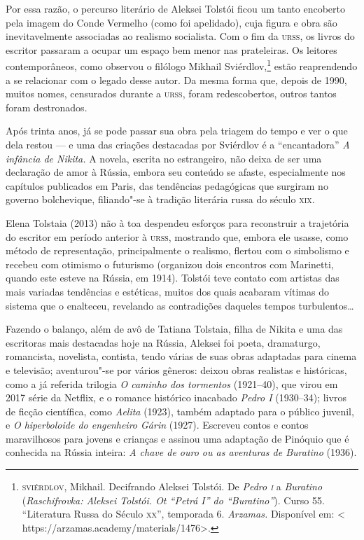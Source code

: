 Por essa razão, o percurso literário de Aleksei Tolstói ficou um tanto
encoberto pela imagem do Conde Vermelho (como foi apelidado), cuja
figura e obra são inevitavelmente associadas ao realismo socialista. Com
o fim da \textsc{urss}, os livros do escritor passaram a ocupar um espaço bem
menor nas prateleiras. Os leitores contemporâneos, como observou o
filólogo Mikhail Sviérdlov,\footnote{\textsc{sviérdlov}, Mikhail. Decifrando
  Aleksei Tolstói. De \emph{Pedro \textsc{i}} a \emph{Buratino}
  (\emph{Raschifrovka: Aleksei Tolstói. Ot ``Petrá I'' do
  ``Buratino''}). Curso 55. ``Literatura Russa do Século \textsc{xx}'', temporada
  6. \emph{Arzamas.} Disponível em: \textless{}
  https://arzamas.academy/materials/1476\textgreater{}.} estão
reaprendendo a se relacionar com o legado desse autor. Da mesma forma
que, depois de 1990, muitos nomes, censurados durante a \textsc{urss}, foram
redescobertos, outros tantos foram destronados.

Após trinta anos, já se pode passar sua obra pela triagem do tempo e ver
o que dela restou --- e uma das criações destacadas por Sviérdlov é a
``encantadora'' \emph{A infância de Nikita.} A novela, escrita no
estrangeiro, não deixa de ser uma declaração de amor à Rússia, embora
seu conteúdo se afaste, especialmente nos capítulos publicados em Paris,
das tendências pedagógicas que surgiram no governo bolchevique,
filiando"-se à tradição literária russa do século \textsc{xix}.

Elena Tolstaia (2013) não à toa despendeu esforços para reconstruir a
trajetória do escritor em período anterior à \textsc{urss}, mostrando que, embora
ele usasse, como método de representação, principalmente o realismo,
flertou com o simbolismo e recebeu com otimismo o futurismo (organizou
dois encontros com Marinetti, quando este esteve na Rússia, em 1914).
Tolstói teve contato com artistas das mais variadas tendências e
estéticas, muitos dos quais acabaram vítimas do sistema que o enalteceu,
revelando as contradições daqueles tempos turbulentos\ldots{}

Fazendo o balanço, além de avô de Tatiana Tolstaia, filha de Nikita e
uma das escritoras mais destacadas hoje na Rússia, Aleksei foi poeta,
dramaturgo, romancista, novelista, contista, tendo várias de suas obras
adaptadas para cinema e televisão; aventurou"-se por vários gêneros:
deixou obras realistas e históricas, como a já referida trilogia \emph{O
caminho dos tormentos} (1921--40), que virou em 2017 série da Netflix, e
o romance histórico inacabado \emph{Pedro I} (1930--34); livros de
ficção científica, como \emph{Aelita} (1923), também adaptado para o
público juvenil, e \emph{O hiperboloide do engenheiro Gárin} (1927).
Escreveu contos e contos maravilhosos para jovens e crianças e assinou
uma adaptação de Pinóquio que é conhecida na Rússia inteira: \emph{A
chave de ouro ou as aventuras de Buratino} (1936).


